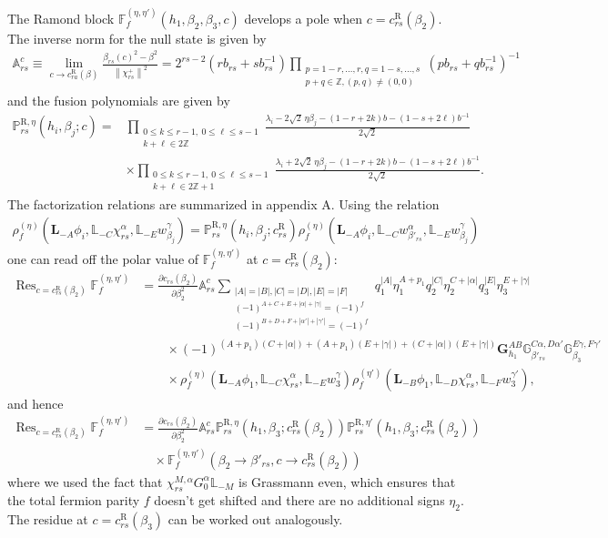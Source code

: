 \documentclass[12pt]{article}
\newcommand{\ie}{\begin{equation}\begin{aligned}}
\newcommand{\fe}{\end{aligned}\end{equation}}
\numberwithin{equation}{section}
\newcommand{\R}{\mathrm{R}}
\begin{document}
The Ramond block $\mathbb{F}^{(\eta, \eta')}_f(h_1, \beta_2, \beta_3, c)$ develops a pole when $c=c_{rs}^{\mathrm{R}}(\beta_2)$. The inverse norm for the null state is given by
\ie
\mathbb{A}_{r s}^c \equiv \lim _{c \rightarrow c_{r a}^{\mathrm{R}}(\beta)} \frac{\beta_{r s}(c)^2-\beta^2}{\left\|\chi_{r s}^{+}\right\|^2}=2^{r s-2}\left(r b_{r s}+s b_{r s}^{-1}\right) \prod_{\substack{p=1-r, \ldots, r, q=1-s, \ldots, s \\ p+q \in \mathbb{Z},(p, q) \neq(0,0)}}\left(p b_{r s}+q b_{r s}^{-1}\right)^{-1}
\fe
and the fusion polynomials are given by 
\ie
\mathbb{P}_{rs}^{\R,\eta}(h_i,\beta_j;c)
={}&
\prod_{\substack{0\le k\le r-1,\ 0\le\ell\le s-1\\k+\ell\in2\mathbb Z}}
\frac{\lambda_i-2\sqrt2\,\eta\beta_j
 -(1-r+2k)b-(1-s+2\ell)b^{-1}}{2\sqrt2}\\
&\times
\prod_{\substack{0\le k\le r-1,\ 0\le\ell\le s-1\\k+\ell\in2\mathbb Z+1}}
\frac{\lambda_i+2\sqrt2\,\eta\beta_j
 -(1-r+2k)b-(1-s+2\ell)b^{-1}}{2\sqrt2}.
\fe
The factorization relations are summarized in appendix A. Using the relation
\ie
\rho_f^{(\eta)}
 (\mathbf{L}_{-A}\phi_i,
  \mathbb{L}_{-C}\chi_{rs}^{\alpha},
  \mathbb{L}_{-E}w_{\beta_j}^{\gamma})=
 \mathbb{P}_{rs}^{\R,\eta}(h_i,\beta_j;c_{rs}^{\R})
 \rho_f^{(\eta)}
 (\mathbf{L}_{-A}\phi_i,
  \mathbb{L}_{-C}w_{\beta'_{rs}}^{\alpha},
  \mathbb{L}_{-E}w_{\beta_j}^{\gamma})
\fe
one can read off the polar value of $\mathbb{F}_f^{(\eta, \eta')}$ at $c=c_{rs}^{\R}(\beta_2)$:
\ie
\operatorname{Res}_{c=c_{rs}^{\R}(\beta_2)} \mathbb{F}_f^{(\eta, \eta')} &= \frac{\partial c_{rs}(\beta_2)}{\partial \beta^2_2}\mathbb{A}_{rs}^c\sum_{\substack{|A|=|B|, |C|=|D|, |E|=|F|\\ (-1)^{A+C+E+|\alpha|+|\gamma|}=(-1)^f\\(-1)^{B+D+F+|\alpha'|+|\gamma'|}=(-1)^f}} q_1^{|A|}\eta_1^{A+p_1} q_2^{|C|}\eta_2^{C+|\alpha|} q_3^{|E|} \eta_3^{E+|\gamma|} \\
&\quad\quad \times (-1)^{(A+p_1)(C+|\alpha|)+(A+p_1)(E+|\gamma|)+(C+|\alpha|)(E+|\gamma|)}\mathbf{G}^{AB}_{h_1} \mathbb{G}^{C\alpha, D\alpha'}_{\beta'_{rs}} \mathbb{G}^{E\gamma, F\gamma'}_{\beta_3}\\
&\quad\quad \times \rho_f^{(\eta)}(\mathbf{L}_{-A}\phi_1, \mathbb{L}_{-C}\chi^\alpha_{rs}, \mathbb{L}_{-E}w^\gamma_3)\rho_f^{(\eta')}(\mathbf{L}_{-B}\phi_1, \mathbb{L}_{-D}\chi^\alpha_{rs}, \mathbb{L}_{-F}w^{\gamma'}_3),
\fe
and hence
\ie
\operatorname{Res}_{c=c_{rs}^{\R}(\beta_2)} \mathbb{F}_f^{(\eta, \eta')}&=\frac{\partial c_{rs}(\beta_2)}{\partial \beta^2_2}\mathbb{A}_{rs}^c\mathbb{P}_{rs}^{\R,\eta}(h_1,\beta_3;c_{rs}^\R(\beta_2))\mathbb{P}_{rs}^{\R,\eta'}(h_1,\beta_3;c_{rs}^\R(\beta_2))\\
&\quad \times\mathbb{F}_f^{(\eta, \eta')}(\beta_2\rightarrow \beta'_{rs},c\rightarrow c^{\R}_{rs}(\beta_2))
\fe
where we used the fact that $\chi_{rs}^{M,\alpha} G_0^\alpha \mathbb{L}_{-M}$ is Grassmann even, which ensures that the total fermion parity $f$ doesn't get shifted and there are no additional signs $\eta_2$. The residue at $c=c^{\R}_{rs}(\beta_3)$ can be worked out analogously.
\end{document}
